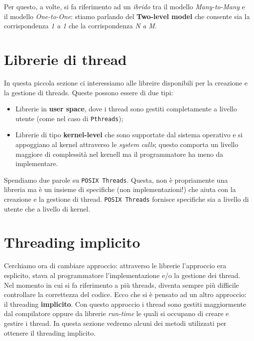 Per questo, a volte, si fa riferimento ad un \textit{ibrido} tra il modello \textit{Many-to-Many} e il modello \textit{One-to-One}: stiamo parlando del \textbf{Two-level model} che consente sia la corrispondenza \textit{1 a 1} che la corrispondenza \textit{N a M}.

% 
\section{Librerie di thread}
In questa piccola sezione ci interessiamo alle libreire disponibili per la creazione e la gestione di threads. Queste possono essere di due tipi:
\begin{itemize}
\setlength{\itemsep}{-.15 em}
    \item Librerie in \textbf{user space}, dove i thread sono gestiti completamente a livello utente (come nel caso di \texttt{Pthreads});
    \item Librerie di tipo \textbf{kernel-level} che sono supportate dal sistema operativo e si appoggiano al kernel attraverso le \textit{system calls}; questo comporta un livello maggiore di complessità nel kernell ma il programmatore ha meno da implementare.
\end{itemize}

\noindent Spendiamo due parole su \texttt{POSIX Threads}. Questa, non è propriamente una libreria ma è un insieme di specifiche (non implementazioni!) che aiuta con la creazione e la gestione di thread. \texttt{POSIX Threads} fornisce specifiche sia a livello di utente che a livello di kernel.

% 
\section{Threading implicito}
Cerchiamo ora di cambiare approccio: attraverso le librerie l'approccio era esplicito, stava al programmatore l'implementazione e/o la gestione dei thread. Nel momento in cui si fa riferimento a più threads, diventa sempre più difficile controllare la correttezza del codice. Ecco che si è pensato ad un altro approccio: il threading \textbf{implicito}. Con questo approccio i thread sono gestiti maggiormente dal compilatore oppure da librerie \textit{run-time} le quali si occupano di creare e gestire i thread. In questa sezione vedremo alcuni dei metodi utilizzati per ottenere il threading implicito. 
% 

